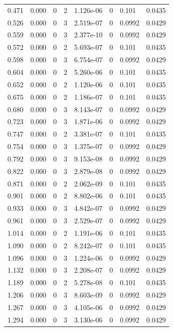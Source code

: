 \documentclass[preview]{standalone}
\begin{document}
{{\begin{tabular}{L{1.2cm}C{1.2cm} C{0.3cm}C{0.5cm} C{1.4cm}C{1.4cm} C{1.4cm}C{1.4cm}}
  0.471  &  0.000  & 0     &  2 &  1.126e-06  & 0  & 0.101 &  0.0435   \\ 
  0.526  &  0.000  & 0     &  3 &  2.519e-07  & 0  & 0.0992 &  0.0429   \\ 
  0.559  &  0.000  & 0     &  3 &  2.377e-10  & 0  & 0.0992 &  0.0429   \\ 
  0.572  &  0.000  & 0     &  2 &  5.693e-07  & 0  & 0.101 &  0.0435   \\ 
  0.598  &  0.000  & 0     &  3 &  6.754e-07  & 0  & 0.0992 &  0.0429   \\ 
  0.604  &  0.000  & 0     &  2 &  5.260e-06  & 0  & 0.101 &  0.0435   \\ 
  0.652  &  0.000  & 0     &  2 &  1.120e-06  & 0  & 0.101 &  0.0435   \\ 
  0.675  &  0.000  & 0     &  2 &  1.186e-07  & 0  & 0.101 &  0.0435   \\ 
  0.680  &  0.000  & 0     &  3 &  8.143e-07  & 0  & 0.0992 &  0.0429   \\ 
  0.723  &  0.000  & 0     &  3 &  1.871e-06  & 0  & 0.0992 &  0.0429   \\ 
  0.747  &  0.000  & 0     &  2 &  3.381e-07  & 0  & 0.101 &  0.0435   \\ 
  0.754  &  0.000  & 0     &  3 &  1.375e-07  & 0  & 0.0992 &  0.0429   \\ 
  0.792  &  0.000  & 0     &  3 &  9.153e-08  & 0  & 0.0992 &  0.0429   \\ 
  0.822  &  0.000  & 0     &  3 &  2.879e-08  & 0  & 0.0992 &  0.0429   \\ 
  0.871  &  0.000  & 0     &  2 &  2.062e-09  & 0  & 0.101 &  0.0435   \\ 
  0.901  &  0.000  & 0     &  2 &  8.802e-06  & 0  & 0.101 &  0.0435   \\ 
  0.933  &  0.000  & 0     &  3 &  4.842e-07  & 0  & 0.0992 &  0.0429   \\ 
  0.961  &  0.000  & 0     &  3 &  2.529e-07  & 0  & 0.0992 &  0.0429   \\ 
  1.014  &  0.000  & 0     &  2 &  1.191e-06  & 0  & 0.101 &  0.0435   \\ 
  1.090  &  0.000  & 0     &  2 &  8.242e-07  & 0  & 0.101 &  0.0435   \\ 
  1.096  &  0.000  & 0     &  3 &  1.224e-06  & 0  & 0.0992 &  0.0429   \\ 
  1.132  &  0.000  & 0     &  3 &  2.208e-07  & 0  & 0.0992 &  0.0429   \\ 
  1.189  &  0.000  & 0     &  2 &  5.278e-08  & 0  & 0.101 &  0.0435   \\ 
  1.206  &  0.000  & 0     &  3 &  8.603e-09  & 0  & 0.0992 &  0.0429   \\ 
  1.267  &  0.000  & 0     &  3 &  4.105e-06  & 0  & 0.0992 &  0.0429   \\ 
  1.294  &  0.000  & 0     &  3 &  3.130e-06  & 0  & 0.0992 &  0.0429   \\ 
\hline 
\end{tabular} 

}}
\end{document}
